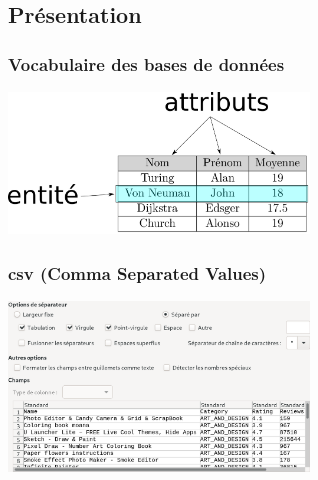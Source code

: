\documentclass[svgnames,11pt]{beamer}
\begin{document}
\subsection{Présentation}
\begin{frame}
    \frametitle{Vocabulaire des bases de données}

    \begin{center}
        \centering
        \includegraphics[width=8cm]{ressources/vocabulaire-legende.png}
        \label{IMG}
    \end{center}

\end{frame}
\begin{frame}
    \frametitle{csv (Comma Separated Values)}

    \begin{center}
        \centering
        \includegraphics[width=8cm]{ressources/jeu-donnees.png}
        \label{IMG}
    \end{center}

\end{frame}
\end{document}
